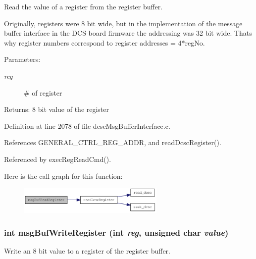 Read the value of a register from the register buffer. 

Originally, registers were 8 bit wide, but in the implementation of the message buffer interface in the DCS board firmware the addressing was 32 bit wide. Thats why register numbers correspond to register addresses = 4$\ast$reg\-No. \begin{Desc}
\item[Parameters:]
\begin{description}
\item[{\em reg}]\# of register \end{description}
\end{Desc}
\begin{Desc}
\item[Returns:]8 bit value of the register \end{Desc}


Definition at line 2078 of file dcsc\-Msg\-Buffer\-Interface.c.

References GENERAL\_\-CTRL\_\-REG\_\-ADDR, and read\-Dcsc\-Register().

Referenced by exec\-Reg\-Read\-Cmd().

Here is the call graph for this function:\begin{figure}[H]
\begin{center}
\leavevmode
\includegraphics[width=201pt]{group__dcsc__msg__buffer__access_g7a5b0d57fbd0a68206468a01b0a63520_cgraph}
\end{center}
\end{figure}
\hypertarget{group__dcsc__msg__buffer__access_g82e19c9d34c7ecebcba115d2a6393b6c}{
\subsubsection[msgBufWriteRegister]{\setlength{\rightskip}{0pt plus 5cm}int msg\-Buf\-Write\-Register (int {\em reg}, unsigned char {\em value})}}
\label{group__dcsc__msg__buffer__access_g82e19c9d34c7ecebcba115d2a6393b6c}


Write an 8 bit value to a register of the register buffer. 

